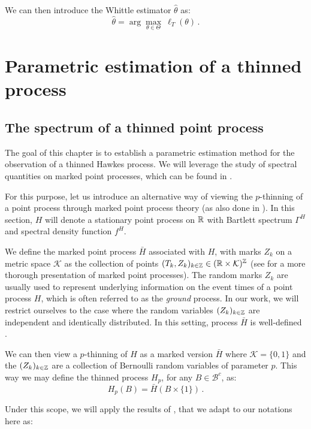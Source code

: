 We can then introduce the Whittle estimator $\hat \theta$ \parencite{Whittle1952} as:
\[\hat \theta = \arg\max_{\theta \in \Theta}~ \ell_T (\theta)\,.\]

\section{Parametric estimation of a thinned process}\label{sec:chap5_estimation}

    \subsection{The spectrum of a thinned point process}\label{sec:chap5_thinned_spectrum}

The goal of this chapter is to establish a parametric estimation method for the observation of a thinned Hawkes process.
We will leverage the study of spectral quantities on marked point processes, 
which can be found in \textcite{Bremaud2002, Bremaud2005}. 

For this purpose, let us introduce an alternative way of viewing the $p$-thinning of a point process through marked point process theory (as also done in \textcite{Cronie2024}).
In this section, $H$ will denote a stationary point process on ${\mathbb R}$ with Bartlett spectrum $\Gamma^H$ and spectral density function $f^H$.

We define the marked point process $\bar H$ associated with $H$, with marks $Z_k$ on a metric space $\mathcal{K}$ as the collection of points
$(T_k, Z_k)_{k\in{\mathbb Z}} \in ({\mathbb R} \times \mathcal{K})^{{\mathbb Z}}$ (see \textcite[Chapter 6.4]{DaleyV1} for a more thorough presentation of marked point processes). 
The random marks $Z_k$ are usually used to represent underlying information on the event times of a point process $H$, 
which is often referred to as the \textit{ground} process.
In our work, we will restrict ourselves to the case where the random variables $(Z_k)_{k\in{\mathbb Z}}$ are independent and identically distributed.
In this setting, process $\bar H$ is well-defined \parencite[6.4.IV(a)]{DaleyV1}.

We can then view a $p$-thinning of $H$ as a marked version $\bar H$ where $\mathcal{K} = \{0,1\}$
and the $(Z_k)_{k\in{\mathbb Z}}$ are a collection of Bernoulli random variables of parameter $p$.
This way we may define the thinned process $H_p$, for any $B\in\mathcal{B}^c$, as:
\[H_p(B) = \bar H(B\times\{1\})\,.\]

Under this scope, we will apply the results of \textcite{Bremaud2005}, 
that we adapt to our notations here as:

